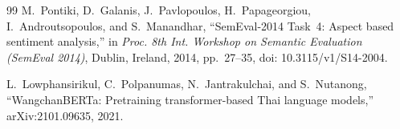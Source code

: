 \documentclass[10pt,twocolumn]{article}
\begin{document}
\begin{thebibliography}{99}
M.~Pontiki, D.~Galanis, J.~Pavlopoulos, H.~Papageorgiou, I.~Androutsopoulos, and
S.~Manandhar, ``SemEval-2014 Task~4: Aspect based sentiment analysis,'' in \emph{Proc.
8th Int. Workshop on Semantic Evaluation (SemEval 2014)}, Dublin, Ireland, 2014,
pp.~27--35, doi: 10.3115/v1/S14-2004.

L.~Lowphansirikul, C.~Polpanumas, N.~Jantrakulchai, and S.~Nutanong,
``WangchanBERTa: Pretraining transformer-based Thai language models,''
arXiv:2101.09635, 2021.

\end{thebibliography}
\end{document}
